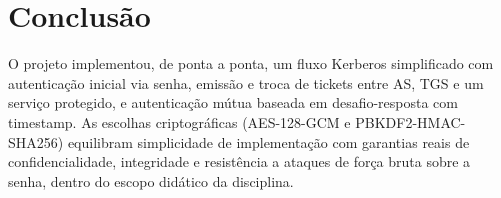 \documentclass[11pt,a4paper]{article}
\begin{document}
\section{Conclusão}

O projeto implementou, de ponta a ponta, um fluxo Kerberos simplificado com autenticação
inicial via senha, emissão e troca de tickets entre AS, TGS e um serviço protegido, e
autenticação mútua baseada em desafio-resposta com timestamp. As escolhas
criptográficas (AES-128-GCM e PBKDF2-HMAC-SHA256) equilibram simplicidade de implementação
com garantias reais de confidencialidade, integridade e resistência a ataques de força
bruta sobre a senha, dentro do escopo didático da disciplina.
\end{document}
